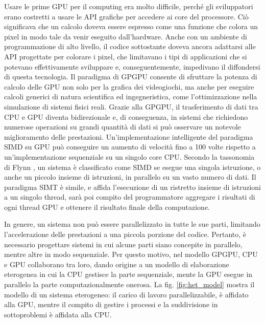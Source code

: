 Usare le prime GPU per il computing era molto difficile, perché gli sviluppatori erano costretti a usare le API grafiche per accedere ai core del processore. Ciò significava che un calcolo doveva essere espresso come una funzione che colora un pixel in modo tale da venir eseguito dall'hardware. Anche con un ambiente di programmazione di alto livello, il codice sottostante doveva ancora adattarsi alle API progettate per colorare i pixel, che limitavano i tipi di applicazioni che si potevano effettivamente sviluppare e, conseguentemente, impedivano il diffondersi di questa tecnologia.
Il paradigma di GPGPU consente di sfruttare la potenza di calcolo delle GPU non solo per la grafica dei videogiochi, ma anche per eseguire calcoli generici di natura scientifica ed ingegneristica, come l'ottimizzazione nella simulazione di sistemi fisici reali. Grazie alla GPGPU, il trasferimento di dati tra CPU e GPU diventa bidirezionale e, di conseguenza, in sistemi che richiedono numerose operazioni su grandi quantità di dati si può osservare un notevole miglioramento delle prestazioni. Un'implementazione intelligente del paradigma SIMD su GPU può conseguire un aumento di velocità fino a 100 volte rispetto a un'implementazione sequenziale su un singolo core CPU. Secondo la tassonomia di Flynn \cite[]{Flynn:tax}, un sistema è classificato come SIMD se esegue una singola istruzione, o anche un piccolo insieme di istruzioni, in parallelo su un vasto numero di dati. Il paradigma SIMT è simile, e affida l'esecuzione di un ristretto insieme di istruzioni a un singolo thread, sarà poi compito del programmatore aggregare i risultati di ogni thread GPU e ottenere il risultato finale della computazione.

In genere, un sistema non può essere parallelizzato in tutte le sue parti, limitando l'accelerazione delle prestazioni a una piccola porzione del codice. Pertanto, è necessario progettare sistemi in cui alcune parti siano concepite in parallelo, mentre altre in modo sequenziale. Per questo motivo, nel modello GPGPU, CPU e GPU collaborano tra loro, dando origine a un modello di elaborazione eterogenea in cui la CPU gestisce la parte sequenziale, mente la GPU esegue in parallelo la parte computazionalmente onerosa.
La fig. \ref{fig:het_model} mostra il modello di un sistema eterogeneo: il carico di lavoro parallelizzabile, è affidato alla GPU, mentre il compito di gestire i processi e la suddivisione in sottoproblemi è affidata alla CPU.

